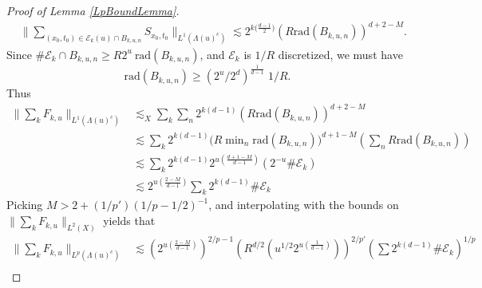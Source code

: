 \begin{proof}[Proof of Lemma \ref{LpBoundLemma}]
\begin{equation}
\begin{split}
    &\Big\| \sum\nolimits_{(x_0,t_0) \in \mathcal{E}_k(u) \cap B_{k,u,n}} S\!_{x_0,t_0} \Big\|_{L^1(\Lambda(u)^c)} \lesssim 2^{k \big( \frac{d - 1}{2} \big)} (R \text{rad}(B_{k,u,n}))^{d + 2 - M}.
\end{split}
\end{equation}
%
Since $\# \mathcal{E}_k \cap B_{k,u,n} \geq R 2^{u}\ \text{rad}(B_{k,u,n})$, and $\mathcal{E}_k$ is $1/R$ discretized, we must have
%
\begin{equation}
    \text{rad}(B_{k,u,n}) \geq (2^u / 2^d)^{\frac{1}{d-1}}\; 1/R.
\end{equation}
%
Thus
%
%
\begin{equation}
\begin{split}
    \Big\| \sum\nolimits_k F_{k,u} \Big\|_{L^1(\Lambda(u)^c)} &\lesssim_X \sum\nolimits_k \sum\nolimits_n 2^{k (d-1)} (R \text{rad}(B_{k,u,n}))^{d + 2 - M}\\
    &\lesssim \sum\nolimits_k 2^{k(d-1)} \Big( R \min\nolimits_n \text{rad}(B_{k,u,n}) \Big)^{d + 1 - M} \left( \sum\nolimits_n R \text{rad}(B_{k,u,n}) \right) \\
    &\lesssim \sum\nolimits_k 2^{k (d-1)} 2^{u \left( \frac{d+1-M}{d-1} \right)} \left( 2^{-u} \# \mathcal{E}_k \right)\\
    &\lesssim 2^{u \left( \frac{2-M}{d-1} \right)} \sum\nolimits_k 2^{k (d-1)} \# \mathcal{E}_k
\end{split}
\end{equation}
%
Picking $M > 2 + (1/p')(1/p - 1/2)^{-1}$, and interpolating with the bounds on $\| \sum_k F_{k,u} \|_{L^2(X)}$ yields that
%
\begin{equation}
\begin{split}
    \Big\| \sum\nolimits_k F_{k,u} \Big\|_{L^p(\Lambda(u)^c)} &\lesssim \left( 2^{u \left( \frac{2-M}{d-1} \right)} \right)^{2/p - 1} \left( R^{d/2} \left( u^{1/2} 2^{u \left( \frac{1}{d-1} \right)} \right) \right)^{2/p'} \left( \sum 2^{k(d-1)} \# \mathcal{E}_k \right)^{1/p} \\

\end{split}
\end{equation}
\end{proof}
